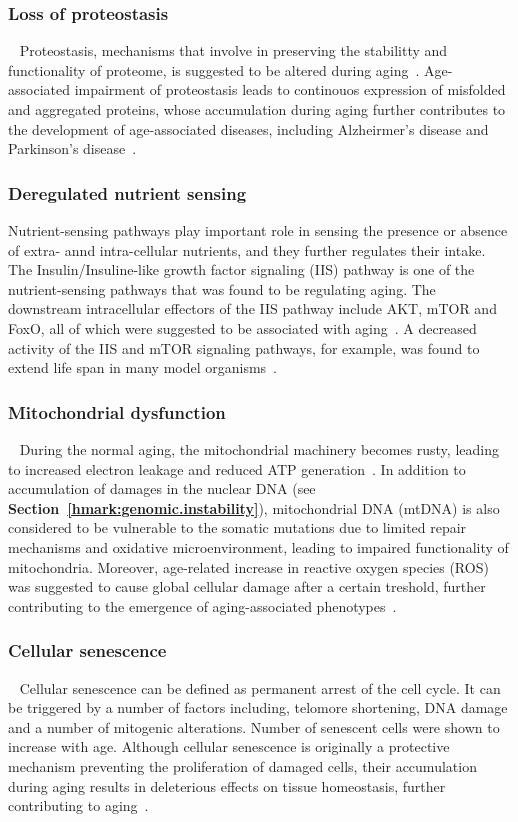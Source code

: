\subsubsection{Loss of proteostasis}~\label{hmark:proteosis}
Proteostasis, mechanisms that involve in preserving the stabilitty and functionality of proteome, is suggested to be altered during aging~\cite{Koga2011}. 
Age-associated impairment of proteostasis leads to continouos expression of misfolded and aggregated proteins, 
whose accumulation during aging further contributes to the development of age-associated diseases, including Alzheirmer's disease and Parkinson's disease~\cite{Powers2009}.

\subsubsection{Deregulated nutrient sensing}
Nutrient-sensing pathways play important role in sensing the presence or absence of extra- annd intra-cellular nutrients, and they further regulates their intake.
The Insulin/Insuline-like growth factor signaling (IIS) pathway is one of the nutrient-sensing pathways that was found to be regulating aging.
The downstream intracellular effectors of the IIS pathway include AKT, mTOR and FoxO, all of which were suggested to be associated with aging~\cite{Fontana2010, Barzilai2012, Kenyon2010}.
A decreased activity of the IIS and mTOR signaling pathways, for example, was found to extend life span in many model organisms~\cite{Fontana2010}. 

\subsubsection{Mitochondrial dysfunction}~\label{hmark:mt.dysfunction}
During the normal aging, the mitochondrial machinery becomes rusty, leading to increased electron leakage and reduced ATP generation~\cite{Green2011}.
In addition to accumulation of damages in the nuclear DNA (see \textbf{Section~\ref{hmark:genomic.instability}}), 
mitochondrial DNA (mtDNA) is also considered to be vulnerable to the somatic mutations due to limited repair mechanisms and oxidative microenvironment,
leading to impaired functionality of mitochondria.
Moreover, age-related increase in reactive oxygen species (ROS) was suggested to cause global cellular damage after a certain treshold, 
further contributing to the emergence of aging-associated phenotypes~\cite{Hekimi2011}.

\subsubsection{Cellular senescence}~\label{hmark:cell.senes}
Cellular senescence can be defined as permanent arrest of the cell cycle.
It can be triggered by a number of factors including, telomore shortening, DNA damage and a number of mitogenic alterations.
Number of senescent cells were shown to increase with age.
Although cellular senescence is originally a protective mechanism preventing the proliferation of damaged cells,
their accumulation during aging results in deleterious effects on tissue homeostasis, further contributing to aging~\cite{Lopez2013}.

